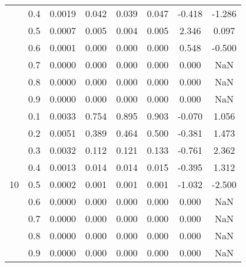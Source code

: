 \documentclass[11pt,a4paper]{report}
\begin{document}
\begin{longtable}{ | c | c || c | c | c | c | c | c | }
 & 0.4 & 0.0019 & 0.042 & 0.039 & 0.047 & -0.418 & -1.286 \\
 & 0.5 & 0.0007 & 0.005 & 0.004 & 0.005 & 2.346 & 0.097 \\
 & 0.6 & 0.0001 & 0.000 & 0.000 & 0.000 & 0.548 & -0.500 \\
 & 0.7 & 0.0000 & 0.000 & 0.000 & 0.000 & 0.000 & NaN \\
 & 0.8 & 0.0000 & 0.000 & 0.000 & 0.000 & 0.000 & NaN \\
 & 0.9 & 0.0000 & 0.000 & 0.000 & 0.000 & 0.000 & NaN \\
 \hline
\multirow{9}{*}{10} & 0.1 & 0.0033 & 0.754 & 0.895 & 0.903 & -0.070 & 1.056 \\
 & 0.2 & 0.0051 & 0.389 & 0.464 & 0.500 & -0.381 & 1.473 \\
 & 0.3 & 0.0032 & 0.112 & 0.121 & 0.133 & -0.761 & 2.362 \\
 & 0.4 & 0.0013 & 0.014 & 0.014 & 0.015 & -0.395 & 1.312 \\
 & 0.5 & 0.0002 & 0.001 & 0.001 & 0.001 & -1.032 & -2.500 \\
 & 0.6 & 0.0000 & 0.000 & 0.000 & 0.000 & 0.000 & NaN \\
 & 0.7 & 0.0000 & 0.000 & 0.000 & 0.000 & 0.000 & NaN \\
 & 0.8 & 0.0000 & 0.000 & 0.000 & 0.000 & 0.000 & NaN \\
 & 0.9 & 0.0000 & 0.000 & 0.000 & 0.000 & 0.000 & NaN \\
 \hline
\hline
\end{longtable}
\end{document}
